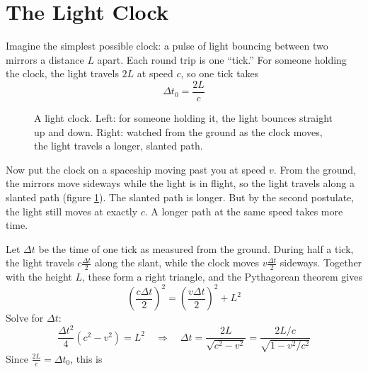 \section{The Light Clock}
Imagine the simplest possible clock: a pulse of light bouncing between two mirrors a distance $L$
apart. Each round trip is one ``tick.'' For someone holding the clock, the light travels $2L$ at
speed $c$, so one tick takes
$$\Delta t_0 = \frac{2L}{c}$$

\begin{figure}[H]
\centering
{}
\caption{A light clock. Left: for someone holding it, the light bounces straight up and down.
Right: watched from the ground as the clock moves, the light travels a longer, slanted path.}
\label{fig:light-clock}
\end{figure}

Now put the clock on a spaceship moving past you at speed $v$. From the ground, the mirrors move
sideways while the light is in flight, so the light travels along a slanted path (figure
\ref{fig:light-clock}). The slanted path is longer. But by the second postulate, the light still
moves at exactly $c$. A longer path at the same speed takes more time.

Let $\Delta t$ be the time of one tick as measured from the ground. During half a tick, the light
travels $c\frac{\Delta t}{2}$ along the slant, while the clock moves $v\frac{\Delta t}{2}$ sideways.
Together with the height $L$, these form a right triangle, and the Pythagorean theorem gives
$$\left(\frac{c\Delta t}{2}\right)^2 = \left(\frac{v\Delta t}{2}\right)^2 + L^2$$
Solve for $\Delta t$:
$$\frac{\Delta t^2}{4}\left(c^2 - v^2\right) = L^2 \quad\Longrightarrow\quad
\Delta t = \frac{2L}{\sqrt{c^2 - v^2}} = \frac{2L/c}{\sqrt{1 - v^2/c^2}}$$
Since $\frac{2L}{c} = \Delta t_0$, this is

